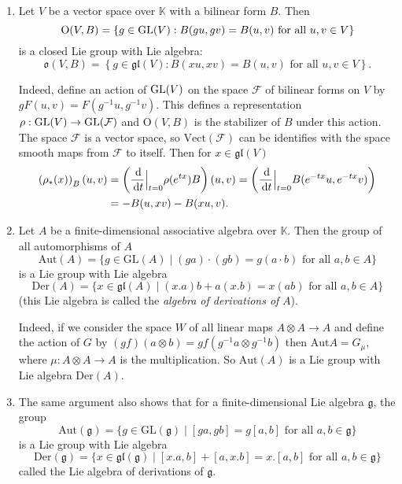 \documentclass{report}
\begin{document}
\begin{example}
    \begin{enumerate}[label = (\roman*)]
        \item 
        Let $V$ be a vector space over $\mathbb K$ with a bilinear form $B$.
        Then
        \[
        \mathrm{O}(V, B) = \left\{ g \in \operatorname{{\mathrm{GL}}}(V) : B(gu, gv) = B(u,v) \text{ for all } u, v \in V \right\}
        \]
        is a closed Lie group with Lie algebra:
        \[
        \mathfrak{o}(V,B) = \left\{ g \in \mathfrak{gl}(V): B(xu, xv) = B(u,v) \text{ for all } u,v \in V\right\}.
        \]
    
        Indeed, define an action of $\operatorname{{\mathrm{GL}}}(V)$ on the space $\mathcal F$ of bilinear forms on $V$ by $gF(u,v) = F(g^{-1}u, g^{-1}v)$.
        This defines a representation $\rho: \operatorname{{\mathrm{GL}}}(V) \to \operatorname{{\mathrm{GL}}}(\mathcal F)$ and $\mathrm{O}(V,B)$ is the stabilizer of $B$ under this action.
        The space $\mathcal F$ is a vector space, so $\mathrm{Vect}(\mathcal F)$ can be identifies with the space smooth maps from $\mathcal F$ to itself.
        Then for $x \in \mathfrak{gl}(V)$
        \begin{align*}
            \left(\rho_*(x)\right)_B(u,v) &= \left( \frac{\,\mathrm{d}}{\,\mathrm{d} t}\Big|_{t=0} \rho(e^{tx}) B\right)(u, v) = \left( \frac{\,\mathrm{d}}{\,\mathrm{d} t}\Big|_{t=0} B(e^{-tx}u, e^{-tx}v)\right)\\
            &= -B(u, xv) - B(xu, v).
        \end{align*}
    
        \item 
        Let $A$ be a finite-dimensional associative algebra over $\mathbb{K}$. Then the group of all automorphisms of $A$
        \[
        \text{Aut}(A) = \{g \in \text{GL}(A) \mid (g a) \cdot (g b) = g(a \cdot b) \text{ for all } a,b \in A\}
        \]
        is a Lie group with Lie algebra
        \[
        \text{Der}(A) = \{x \in \mathfrak{gl}(A) \mid (x.a)b + a(x.b) = x(ab) \text{ for all } a, b \in A\}
        \]
        (this Lie algebra is called the \textit{algebra of derivations of} $A$).
        
        Indeed, if we consider the space $W$ of all linear maps $A \otimes A \to A$ and define the action of $G$ by $(g f)(a \otimes b) = g f(g^{-1}a \otimes g^{-1}b)$ then $\text{Aut} A = G_\mu$, where $\mu : A \otimes A \to A$ is the multiplication. So $\text{Aut}(A)$ is a Lie group with Lie algebra $\text{Der}(A)$.
        \item 
        The same argument also shows that for a finite-dimensional Lie algebra $\mathfrak{g}$, the group
        \[
        \text{Aut}(\mathfrak{g}) = \{ g \in \text{GL}(\mathfrak{g}) \mid [ga, gb] = g[a, b] \text{ for all } a, b \in \mathfrak{g} \}
        \]
        is a Lie group with Lie algebra
        \[
        \text{Der}(\mathfrak{g}) = \{ x \in \mathfrak{gl}(\mathfrak{g}) \mid [x.a, b] + [a, x.b] = x.[a, b] \text{ for all } a, b \in \mathfrak{g} \}
        \]
        called the Lie algebra of derivations of $\mathfrak{g}$.
    \end{enumerate}
\end{example}
\end{document}

